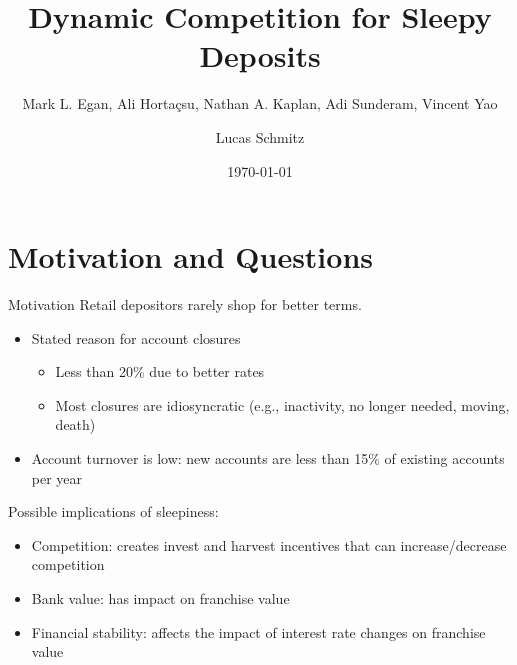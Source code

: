 \documentclass[10pt,aspectratio=169]{beamer}
\title[Sleepy Deposits]{Dynamic Competition for Sleepy Deposits}
\subtitle{Mark L. Egan, Ali Horta\c{c}su, Nathan A. Kaplan, Adi Sunderam, Vincent Yao}
\author[Lucas Schmitz]{Lucas Schmitz}
\institute{Yale Economics}
\date{\today}
\begin{document}

\begin{frame}
  \titlepage
\end{frame}

\section{Motivation and Questions}

\begin{frame}{Motivation}
Retail depositors rarely shop for better terms.
\begin{itemize}
	\item Stated reason for account closures
	\begin{itemize}
		\item Less than 20\% due to better rates 
		\item Most closures are idiosyncratic (e.g., inactivity, no longer needed, moving, death)
	\end{itemize}
	\item Account turnover is low: new accounts are less than 15\% of existing accounts per year
\end{itemize}

Possible implications of sleepiness: 
\begin{itemize}
	\item Competition: creates invest and harvest incentives that can increase/decrease competition
	\item Bank value: has impact on franchise value 
	\item Financial stability: affects the impact of interest rate changes on franchise value 
\end{itemize}
\end{frame}
\end{document}
